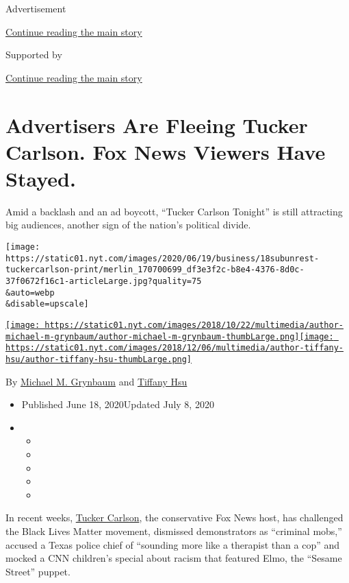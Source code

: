 Advertisement

\protect\hyperlink{after-top}{Continue reading the main story}

Supported by

\protect\hyperlink{after-sponsor}{Continue reading the main story}

\hypertarget{advertisers-are-fleeing-tucker-carlson-fox-news-viewers-have-stayed}{%
\section{Advertisers Are Fleeing Tucker Carlson. Fox News Viewers Have
Stayed.}\label{advertisers-are-fleeing-tucker-carlson-fox-news-viewers-have-stayed}}

Amid a backlash and an ad boycott, ``Tucker Carlson Tonight'' is still
attracting big audiences, another sign of the nation's political divide.

\texttt{[image: https://static01.nyt.com/images/2020/06/19/business/18subunrest-tuckercarlson-print/merlin\_170700699\_df3e3f2c-b8e4-4376-8d0c-37f0672f16c1-articleLarge.jpg?quality=75\\\&auto=webp\\\&disable=upscale]}

\href{https://www.nytimes.com/by/michael-m-grynbaum}{\texttt{[image: https://static01.nyt.com/images/2018/10/22/multimedia/author-michael-m-grynbaum/author-michael-m-grynbaum-thumbLarge.png]}}\href{https://www.nytimes.com/by/tiffany-hsu}{\texttt{[image: https://static01.nyt.com/images/2018/12/06/multimedia/author-tiffany-hsu/author-tiffany-hsu-thumbLarge.png]}}

By \href{https://www.nytimes.com/by/michael-m-grynbaum}{Michael M.
Grynbaum} and \href{https://www.nytimes.com/by/tiffany-hsu}{Tiffany Hsu}

\begin{itemize}
\item
  Published June 18, 2020Updated July 8, 2020
\item
  \begin{itemize}
  \item
  \item
  \item
  \item
  \item
  \end{itemize}
\end{itemize}

In recent weeks,
\href{https://www.nytimes.com/2020/07/13/business/media/tucker-carlson-fox-news-writer.html}{Tucker
Carlson}, the conservative Fox News host, has challenged the Black Lives
Matter movement, dismissed demonstrators as ``criminal mobs,'' accused a
Texas police chief of ``sounding more like a therapist than a cop'' and
mocked a CNN children's special about racism that featured Elmo, the
``Sesame Street'' puppet.

